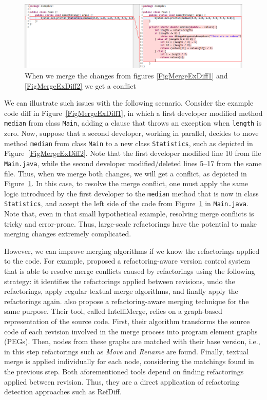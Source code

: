 \begin{figure}[htbp]
\centering
\includegraphics[width=\linewidth]{img/merge-ex-conflict.png}
\caption{When we merge the changes from figures \ref{FigMergeExDiff1} and \ref{FigMergeExDiff2} we get a conflict}
\label{FigMergeExConflict}
\end{figure}

We can illustrate such issues with the following scenario. Consider the example code diff in Figure~\ref{FigMergeExDiff1}, in which a first developer modified method \texttt{median} from class \texttt{Main}, adding a clause that throws an exception when \texttt{length} is zero. Now, suppose that a second developer, working in parallel, decides to move method \texttt{median} from class \texttt{Main} to a new class \texttt{Statistics}, such as depicted in Figure~\ref{FigMergeExDiff2}.
Note that the first developer modified line 10 from file \texttt{Main.java}, while the second developer modified/deleted lines 5--17 from the same file.
Thus, when we merge both changes, we will get a conflict, as depicted in Figure~\ref{FigMergeExConflict}.
In this case, to resolve the merge conflict, one must apply the same logic introduced by the first developer to the \texttt{median} method that is now in class \texttt{Statistics}, and accept the left side of the code from Figure~\ref{FigMergeExConflict} in \texttt{Main.java}.
Note that, even in that small hypothetical example, resolving merge conflicts is tricky and error-prone.
Thus, large-scale refactorings have the potential to make merging changes extremely complicated.

However, we can improve merging algorithms if we know the refactorings applied to the code.
For example, \cite{dig2008effective} proposed a refactoring-aware version control system that is able to resolve merge conflicts caused by refactorings using the following strategy: it identifies the refactorings applied between revisions, undo the refactorings, apply regular textual merge algorithms, and finally apply the refactorings again.
\cite{shen2019intellimerge} also propose a refactoring-aware merging technique for the same purpose. Their tool, called IntelliMerge, relies on a graph-based representation of the source code. First, their algorithm transforms the source code of each revision involved in the merge process into program element graphs (PEGs).
Then, nodes from these graphs are matched with their base version, i.e., in this step refactorings such as \emph{Move} and \emph{Rename} are found.
Finally, textual merge is applied individually for each node, considering the matchings found in the previous step.
Both aforementioned tools depend on finding refactorings applied between revision. Thus, they are a direct application of refactoring detection approaches such as RefDiff.
